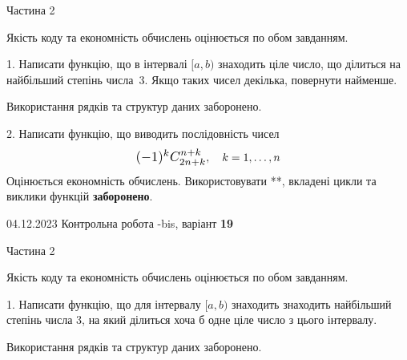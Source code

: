 \documentclass[12pt, ukrainian]{article}
\begin{document}
{{{{{{{{{{{{{{{{{\begin {Huge}
\begin{center}Частина 2
\end{center}
\vspace{10mm}
\end {Huge}

{
\begin {Large}
Якість коду та економність обчислень оцінюється по обом завданням. 

\vspace{5mm}

1. Написати функцію, що в інтервалі $[a, b)$ знаходить ціле число, що ділиться на найбільший степінь числа 3. Якщо таких чисел декілька, повернути найменше.

 Використання рядків та структур даних заборонено. 



\vspace{10mm}



2. 
Написати функцію, що виводить послідовність чисел
$$\scalebox{1.2}{$(-1)^{k}C_{2n+k}^{n+k}$}, \quad k=1,\ldots,n$$
Оцінюється економність обчислень. Використовувати **, вкладені цикли та виклики функцій \textbf{заборонено}.

\end{Large}\newpage




\begin {Huge}
{{04.12.2023 Контрольна робота -bis, варіант  \No \textbf { 19 }\par}}

\begin{center}Частина 2
\end{center}
\vspace{10mm}
\end {Huge}

{
\begin {Large}
Якість коду та економність обчислень оцінюється по обом завданням. 

\vspace{5mm}

1. Написати функцію, що для інтервалу $[a, b)$ знаходить знаходить найбільший степінь числа 3, на який ділиться хоча б одне ціле число з цього інтервалу.

 Використання рядків та структур даних заборонено. 



\vspace{10mm}


\end{Large}}}}}}}}}}}}}}}}}}}}
\end{document}

